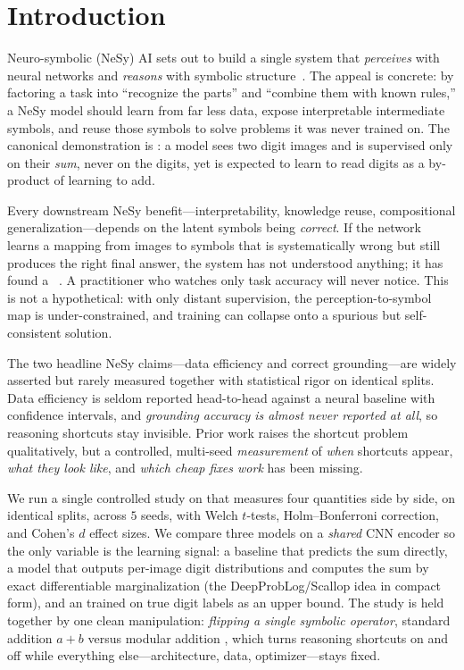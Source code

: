 \section{Introduction}
\label{sec:intro}

Neuro-symbolic (NeSy) AI sets out to build a single system that \emph{perceives} with neural networks
and \emph{reasons} with symbolic structure~\citep{garcez2020,marra2021}. The appeal is concrete: by
factoring a task into ``recognize the parts'' and ``combine them with known rules,'' a NeSy model
should learn from far less data, expose interpretable intermediate symbols, and reuse those symbols
to solve problems it was never trained on. The canonical demonstration is \mnistadd
\citep{manhaeve2018}: a model sees two digit images and is supervised only on their \emph{sum}, never
on the digits, yet is expected to learn to read digits as a by-product of learning to add.

 Every downstream NeSy benefit---interpretability, knowledge
reuse, compositional generalization---depends on the latent symbols being \emph{correct}. If the
network learns a mapping from images to symbols that is systematically wrong but still produces the
right final answer, the system has not understood anything; it has found a ~\citep{li2024softened,deepsymbolic2022}. A practitioner who watches only task accuracy
will never notice. This is not a hypothetical: with only distant supervision, the perception-to-symbol
map is under-constrained, and training can collapse onto a spurious but self-consistent solution.

 The two headline NeSy claims---data efficiency and correct
grounding---are widely asserted but rarely measured together with statistical rigor on identical
splits. Data efficiency is seldom reported head-to-head against a neural baseline with confidence
intervals, and \emph{grounding accuracy is almost never reported at all}, so reasoning shortcuts stay
invisible. Prior work raises the shortcut problem qualitatively, but a controlled, multi-seed
\emph{measurement} of \emph{when} shortcuts appear, \emph{what they look like}, and \emph{which cheap
fixes work} has been missing.

 We run a single controlled study on \mnistadd that measures four quantities
side by side, on identical splits, across $5$ seeds, with Welch $t$-tests, Holm--Bonferroni
correction, and Cohen's $d$ effect sizes. We compare three models on a \emph{shared} CNN encoder so
the only variable is the learning signal: a \neural baseline that predicts the sum directly, a
\nesy model that outputs per-image digit distributions and computes the sum by exact differentiable
marginalization (the DeepProbLog/Scallop idea in compact form), and an \oracle trained on true digit
labels as an upper bound. The study is held together by one clean manipulation: \emph{flipping a single
symbolic operator}, standard addition $a{+}b$ versus modular addition \modten, which turns reasoning
shortcuts on and off while everything else---architecture, data, optimizer---stays fixed.

